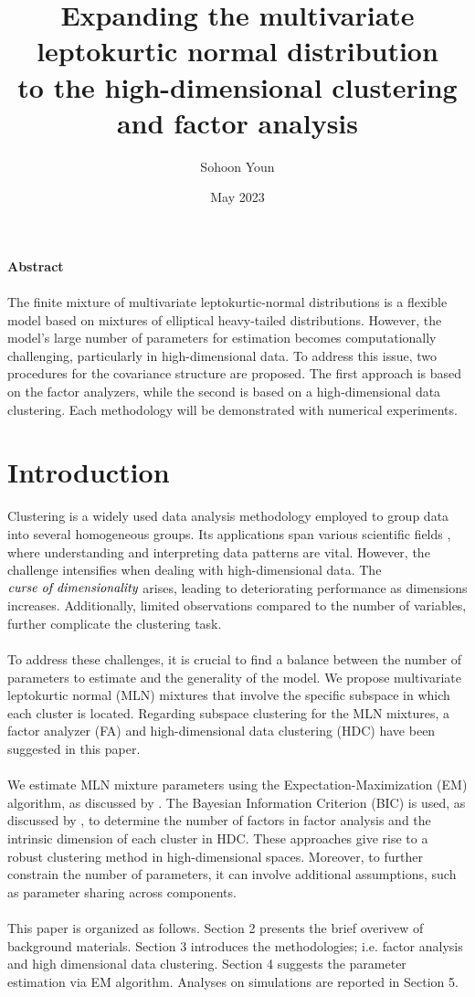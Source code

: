 \documentclass[11pt]{article}
\title{Expanding the multivariate leptokurtic normal distribution\\ to the high-dimensional clustering and factor analysis}
\author{Sohoon Youn}
\date{May 2023}
\begin{document}

\maketitle
\textbf{Abstract}\\
\\
The finite mixture of multivariate leptokurtic-normal distributions is a flexible model based on mixtures of elliptical heavy-tailed distributions. However, the model's large number of parameters for estimation becomes computationally challenging, particularly in high-dimensional data. To address this issue, two procedures for the covariance structure are proposed. The first approach is based on the factor analyzers, while the second is based on a high-dimensional data clustering. Each methodology will be demonstrated with numerical experiments.
\section{Introduction}
Clustering is a widely used data analysis methodology employed to group data into several homogeneous groups. Its applications span various scientific fields \citep{yan2012research}, where understanding and interpreting data patterns are vital. However, the challenge intensifies when dealing with high-dimensional data. The $\emph{curse of dimensionality}$ arises, leading to deteriorating performance as dimensions increases. Additionally, limited observations compared to the number of variables, further complicate the clustering task.\\ 
\\
To address these challenges, it is crucial to find a balance between the number of parameters to estimate and the generality of the model. We propose multivariate leptokurtic normal (MLN) mixtures that involve the specific subspace in which each cluster is located. Regarding subspace clustering for the MLN mixtures, a factor analyzer (FA) and high-dimensional data clustering (HDC) have been suggested in this paper.\\
\\
We estimate MLN mixture parameters using the Expectation-Maximization (EM) algorithm, as discussed by \cite{dempster1977maximum}. The Bayesian Information Criterion (BIC) is used, as discussed by \citep{schwarz1978estimating}, to determine the number of factors in factor analysis and the intrinsic dimension of each cluster in HDC. These approaches give rise to a robust clustering method in high-dimensional spaces. Moreover, to further constrain the number of parameters, it can involve additional assumptions, such as parameter sharing across components.\\
\\
This paper is organized as follows. Section 2 presents the brief overivew of background materials. Section 3 introduces the methodologies; i.e. factor analysis and high dimensional data clustering. Section 4 suggests the parameter estimation via EM algorithm. Analyses on simulations are reported in Section 5. 
\end{document}

